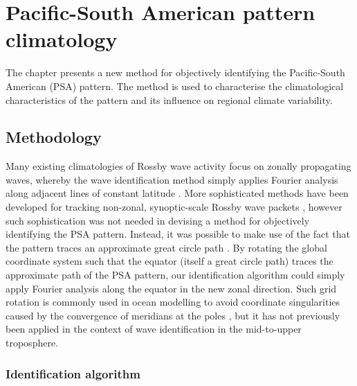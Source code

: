 
\chapter{Pacific-South American pattern climatology}


\begin{synopsis}

The chapter presents a new method for objectively identifying the Pacific-South American (PSA) pattern. The method is used to characterise the climatological characteristics of the pattern and its influence on regional climate variability.

\end{synopsis}


\section{Methodology}

Many existing climatologies of Rossby wave activity focus on zonally propagating waves, whereby the wave identification method simply applies Fourier analysis along adjacent lines of constant latitude \citep[e.g.][]{Glatt2014}. More sophisticated methods have been developed for tracking non-zonal, synoptic-scale Rossby wave packets \citep[e.g.][]{Zimin2006,Souders2014}, however such sophistication was not needed in devising a method for objectively identifying the PSA pattern. Instead, it was possible to make use of the fact that the pattern traces an approximate great circle path \citep{Hoskins1981}. By rotating the global coordinate system such that the equator (itself a great circle path) traces the approximate path of the PSA pattern, our identification algorithm could simply apply Fourier analysis along the equator in the new zonal direction. Such grid rotation is commonly used in ocean modelling to avoid coordinate singularities caused by the convergence of meridians at the poles \citep[i.e. the grid is rotated to place its North Pole over a continent; e.g.][]{Bonaventura2012}, but it has not previously been applied in the context of wave identification in the mid-to-upper troposphere.

\subsection{Identification algorithm}

